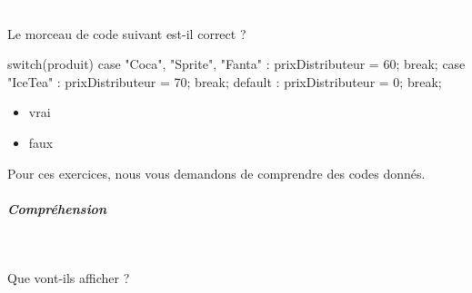 \documentclass[11pt,a4paper]{article}
\begin{document}
                \textcolor{white}{.} \par
            Le morceau de code suivant est-il correct ?
					  \begin{Java}
switch(produit) {
      case "Coca", "Sprite", "Fanta" :
          prixDistributeur = 60;
          break;
      case "IceTea" :
          prixDistributeur = 70;
          break;
      default :
          prixDistributeur = 0;
          break;
}\end{Java}
            \begin{itemize} 
        
            \item[ \ding{"6D} ]  
							vrai
            
        
            \item[ \ding{"6D} ]  
							faux
            
        
            \end{itemize} 
        
          Pour ces exercices, nous vous demandons de comprendre des codes donn\'es. 
        
            \par
        
			
		\subparagraph{Compr\'ehension} 
		
                \textcolor{white}{.} \par
            
							  Que vont-ils afficher ?
              
\end{document}
